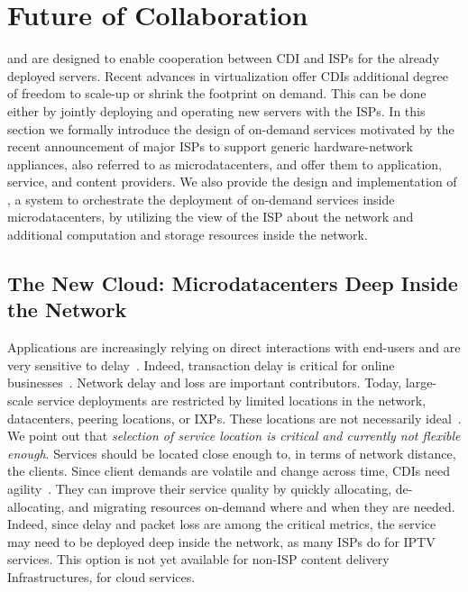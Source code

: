 \section{Future of Collaboration}\label{sec:future}


\padis and \cate are designed to enable cooperation between CDI and ISPs for
the already deployed servers. Recent advances in virtualization offer CDIs
additional degree of freedom to scale-up or shrink the footprint on demand.
This can be done either by jointly deploying and operating new servers with the
ISPs.  In this section we formally introduce the design of on-demand services
motivated by the recent announcement of major ISPs to support generic
hardware-network appliances, also referred to as microdatacenters, and offer
them to application, service, and content providers. We also provide the design
and implementation of \Netpaas, a system to orchestrate the deployment of
on-demand services inside microdatacenters, by utilizing the view of the ISP
about the network and additional computation and storage resources inside the
network.

\subsection{The New Cloud: Microdatacenters Deep Inside the Network}\label{sec:generic-appliances}

Applications are increasingly relying on direct interactions with end-users and
are very sensitive to delay~\cite{ImprovingPerformanceInternet2009}. Indeed,
transaction delay is critical for online
businesses~\cite{amazon-study-about-transaction-speed}.  Network delay and loss
are important contributors.  Today, large-scale service deployments are
restricted by limited locations in the network, \eg datacenters, peering
locations, or IXPs. These locations are not necessarily ideal~\cite{CloudCmp}.
We point out that \emph{selection of service location is critical and currently
not flexible enough}.  Services should be located close enough to, in terms of
network distance, the clients.  Since client demands are volatile and change
across time, CDIs need agility~\cite{EmbrassingleDistributed}.  They can
improve their service quality by quickly allocating, de-allocating, and
migrating resources on-demand where and when they are needed. Indeed, since
delay and packet loss are among the critical metrics, the service may need to
be deployed deep inside the network, as many ISPs do for IPTV services. This
option is not yet available for non-ISP content delivery Infrastructures, \eg
for cloud services.


